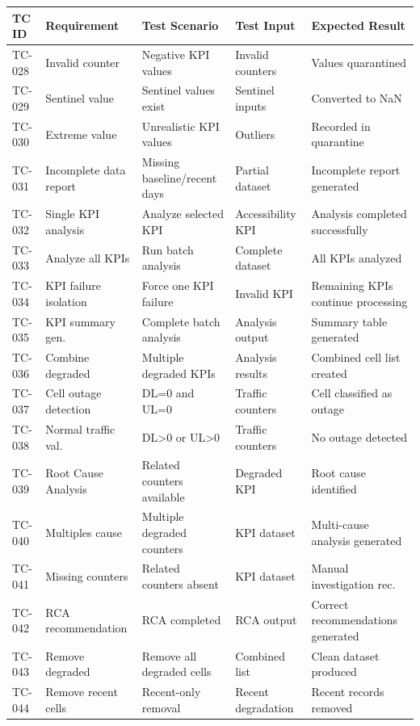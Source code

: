 \begin{center}
\small
\begin{tabularx}{\textwidth}{l X X X X}
\toprule
\textbf{TC ID} & \textbf{Requirement} & \textbf{Test Scenario} & \textbf{Test Input} & \textbf{Expected Result} \\
\midrule
TC-028 & Invalid counter & Negative KPI values & Invalid counters & Values quarantined \\
TC-029 & Sentinel value & Sentinel values exist & Sentinel inputs & Converted to NaN \\
TC-030 & Extreme value & Unrealistic KPI values & Outliers & Recorded in quarantine \\
TC-031 & Incomplete data report & Missing baseline/recent days & Partial dataset & Incomplete report generated \\
TC-032 & Single KPI analysis & Analyze selected KPI & Accessibility KPI & Analysis completed successfully \\
TC-033 & Analyze all KPIs & Run batch analysis & Complete dataset & All KPIs analyzed \\
TC-034 & KPI failure isolation & Force one KPI failure & Invalid KPI & Remaining KPIs continue processing \\
TC-035 & KPI summary gen. & Complete batch analysis & Analysis output & Summary table generated \\
TC-036 & Combine degraded & Multiple degraded KPIs & Analysis results & Combined cell list created \\
TC-037 & Cell outage detection & DL=0 and UL=0 & Traffic counters & Cell classified as outage \\
TC-038 & Normal traffic val. & DL>0 or UL>0 & Traffic counters & No outage detected \\
TC-039 & Root Cause Analysis & Related counters available & Degraded KPI & Root cause identified \\
TC-040 & Multiples cause & Multiple degraded counters & KPI dataset & Multi-cause analysis generated \\
TC-041 & Missing counters & Related counters absent & KPI dataset & Manual investigation rec. \\
TC-042 & RCA recommendation & RCA completed & RCA output & Correct recommendations generated \\
TC-043 & Remove degraded & Remove all degraded cells & Combined list & Clean dataset produced \\
TC-044 & Remove recent cells & Recent-only removal & Recent degradation & Recent records removed \\

\end{tabularx}
\end{center}

